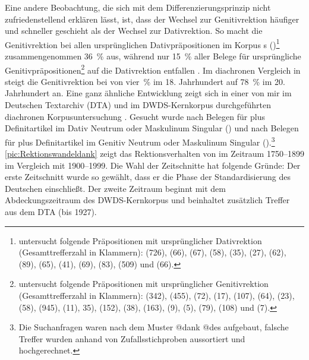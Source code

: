 Eine andere Beobachtung, die sich mit dem Differenzierungsprinzip nicht zufriedenstellend erklären lässt, ist, dass der Wechsel zur Genitivrektion häufiger und schneller geschieht als der Wechsel zur Dativrektion. 
So macht die Genitivrektion bei allen ursprünglichen Dativpräpositionen im Korpus \citeauthor{DiMeola2000}s (\citeyear{DiMeola2000})\footnote{\citet[]{DiMeola2000} untersucht folgende Präpositionen mit ursprünglicher Dativrektion (Gesamttrefferzahl in Klammern):  (726),  (66),  (67),  (58),  (35),  (27),  (62),  (89),  (65),  (41),  (69),  (83),  (509) und  (66).} zusammengenommen 36~\% aus, während nur 15~\% aller Belege für ursprüngliche Genitivpräpositionen\footnote{\citet[]{DiMeola2000} untersucht folgende Präpositionen mit ursprünglicher Genitivrektion (Gesamttrefferzahl in Klammern):  (342),  (455),  (72),  (17),  (107),  (64),  (23),  (58),  (945),  (11),  35),  (152),  (38),  (163),  (9),  (5),  (79),  (108) und  (7).} auf die Dativrektion entfallen \citep[s.][208--209]{DiMeola2000}. 
Im diachronen Vergleich in \citet[236]{DiMeola2000} steigt die Genitivrektion bei  von vier~\% im 18. Jahrhundert auf 78~\% im 20. Jahrhundert an.
Eine ganz ähnliche Entwicklung zeigt sich in einer von mir im Deutschen Textarchiv (DTA) und im DWDS-Kernkorpus durchgeführten diachronen Korpusuntersuchung \citep[s.][]{Vieregge.2019}.
Gesucht wurde nach Belegen für  plus Definitartikel im Dativ Neutrum oder Maskulinum Singular () und nach Belegen für  plus Definitartikel im Genitiv Neutrum oder Maskulinum Singular ().\footnote{Die Suchanfragen waren nach dem Muster \glqq @dank @des\grqq{} aufgebaut, falsche Treffer wurden anhand von Zufallsstichproben aussortiert und hochgerechnet.}
\autoref{pic:Rektionswandeldank} zeigt das Rektionsverhalten von  im Zeitraum 1750--1899 im Vergleich mit 1900--1999. 
Die Wahl der Zeitschnitte hat folgende Gründe: Der erste Zeitschnitt wurde so gewählt, dass er die Phase der Standardisierung des Deutschen einschließt. 
Der zweite Zeitraum beginnt mit dem Abdeckungszeitraum des DWDS-Kernkorpus und beinhaltet zusätzlich Treffer aus dem DTA (bis 1927). 

